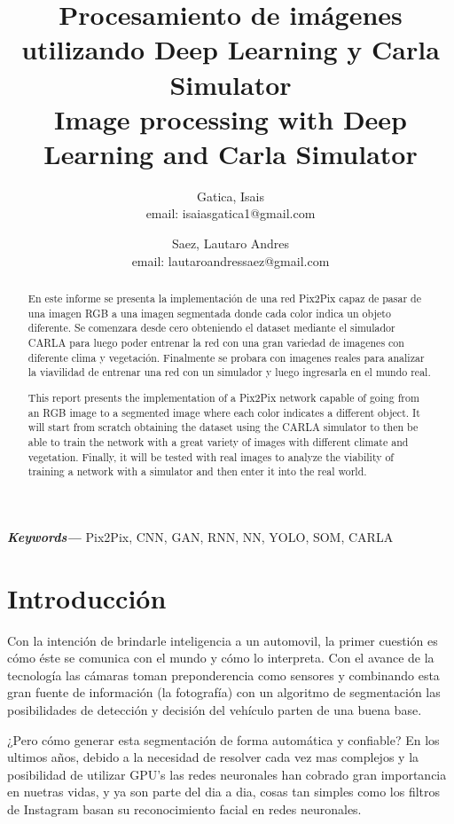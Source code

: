 \documentclass[]{IEEEtran}
\title{Procesamiento de imágenes utilizando Deep Learning y Carla 
Simulator \\ 
Image processing with Deep Learning and Carla Simulator}
\author{ 
Gatica, Isais \\ \small{email: isaiasgatica1@gmail.com} \\ \and 
Saez, Lautaro Andres \\ \small{email: lautaroandressaez@gmail.com } }
\date{}
\providecommand{\keywords}[1]
{
  \small	
  \textbf{\textit{Keywords---}} #1
}
\begin{document}
    \maketitle

    \begin{abstract}
        En este informe se presenta la implementación de una red Pix2Pix capaz de pasar de una imagen RGB a 
        una imagen segmentada donde cada color indica un objeto diferente. Se comenzara desde cero obteniendo el 
        dataset mediante el simulador CARLA para luego poder entrenar la red con una gran variedad de imagenes con 
        diferente clima y vegetación. Finalmente se probara con imagenes reales para analizar la viavilidad de entrenar una 
        red con un simulador y luego ingresarla en el mundo real.
    \end{abstract}


    \begin{abstract}
        This report presents the implementation of a Pix2Pix network capable of going from an RGB image to
        a segmented image where each color indicates a different object. It will start from scratch obtaining the
        dataset using the CARLA simulator to then be able to train the network with a great variety of images with
        different climate and vegetation. Finally, it will be tested with real images to analyze the viability of training a
        network with a simulator and then enter it into the real world.
    \end{abstract}

    \keywords{Pix2Pix, CNN, GAN, RNN, NN, YOLO, SOM, CARLA}


    \section{Introducción}

    Con la intención de brindarle inteligencia a un automovil, la primer cuestión es cómo éste se comunica con el mundo y cómo lo interpreta.
    Con el avance de la tecnología las cámaras toman preponderencia como sensores y combinando esta gran fuente de información (la fotografía) con un 
    algoritmo de segmentación las posibilidades de detección y decisión del vehículo parten de una buena base. 

    ¿Pero cómo generar esta segmentación de forma automática y confiable? En los ultimos años, debido a la necesidad de resolver cada vez mas complejos y la posibilidad de utilizar GPU's las redes neuronales han cobrado 
    gran importancia en nuetras vidas, y ya son parte del dia a dia, cosas tan simples como los filtros de Instagram basan 
    su reconocimiento facial en redes neuronales. 
\end{document}
